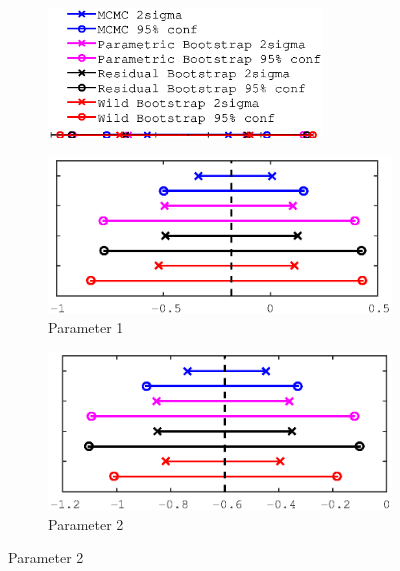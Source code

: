 \documentclass[11pt,a4paper,oneside]{report}
\begin{document}
\begin{figure}
   \centering
    \begin{subfigure}[b]{0.5\textwidth}
    \includegraphics[width=0.8\textwidth, trim=0 15 0 0,clip=true]{figures/task5/uncert_legend.eps}
  \end{subfigure}%
  
  \begin{subfigure}[b]{0.5\textwidth}
    \includegraphics[width=\textwidth, trim=0 0 0 0,clip=true]{figures/task5/uncert_model3_param1.eps}
    \caption{Parameter 1}
  \end{subfigure}%
  \begin{subfigure}[b]{0.5\textwidth}
    \includegraphics[width=\textwidth, trim=0 0 0 0,clip=true]{figures/task5/uncert_model3_param2.eps}
    \caption{Parameter 2}
  \end{subfigure}%
  

\end{figure}
\end{document}

